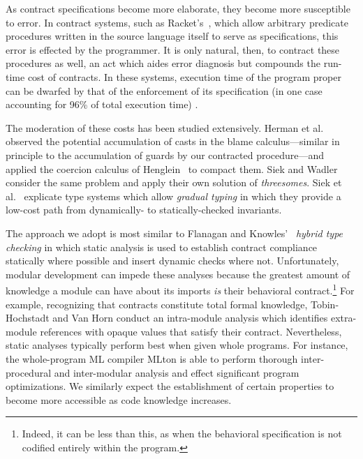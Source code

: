 As contract specifications become more elaborate, they become more susceptible to error.
In contract systems, such as Racket's~\cite{findler2002contracts}, which allow arbitrary predicate procedures written in the source language itself to serve as specifications, this error is effected by the programmer.
It is only natural, then, to contract these procedures as well, an act which aides error diagnosis but compounds the run-time cost of contracts.
In these systems, execution time of the program proper can be dwarfed by that of the enforcement of its specification (in one case accounting for 96\% of total execution time) \cite{strickland2012chaperones}.

The moderation of these costs has been studied extensively.
Herman et al.~\cite{herman2010space} observed the potential accumulation of casts in the blame calculus---similar in principle to the accumulation of guards by our contracted  procedure---and applied the coercion calculus of Henglein~\cite{henglein1994dynamic} to compact them.
Siek and Wadler~\cite{siek2010threesomes} consider the same problem and apply their own solution of \emph{threesomes}.
Siek et al.~\cite{siek2006gradual} explicate type systems which allow \emph{gradual typing} in which they provide a low-cost path from dynamically- to statically-checked invariants.

The approach we adopt is most similar to Flanagan and Knowles'~\cite{flanagan2006hybrid} \emph{hybrid type checking} in which static analysis is used to establish contract compliance statically where possible and insert dynamic checks where not.
Unfortunately, modular development can impede these analyses because the greatest amount of knowledge a module can have about its imports \emph{is} their behavioral contract.\footnote{Indeed, it can be less than this, as when the behavioral specification is not codified entirely within the program.}
For example, recognizing that contracts constitute total formal knowledge, Tobin-Hochstadt and Van Horn \cite{tobin2012higher} conduct an intra-module analysis which identifies extra-module references with opaque values that satisfy their contract.
Nevertheless, static analyses typically perform best when given whole programs.
For instance, the whole-program ML compiler MLton \cite{weeks2006whole} is able to perform thorough inter-procedural and inter-modular analysis and effect significant program optimizations.
We similarly expect the establishment of certain properties to become more accessible as code knowledge increases.

